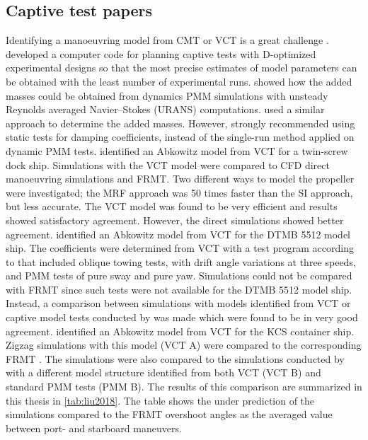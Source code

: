 \subsection{Captive test papers} \label{sec:CT}
Identifying a manoeuvring model from CMT or VCT is a great challenge  \cite{sutuloAlgorithmOfflineIdentification2014}.
\textcite{sutuloSynthesisExperimentalDesigns2004} developed a computer code for planning captive tests with D-optimized experimental designs so that the most precise estimates of model parameters can be obtained with the least number of experimental runs.
\textcite{sakamotoURANSSimulationsStatic2012} showed how the added masses could be obtained from dynamics PMM simulations with unsteady Reynolds averaged Navier–Stokes (URANS) computations. \textcite{elmoctarRANSBasedSimulatedShip2014} used a similar approach to determine the added masses. 
However, \textcite{sakamotoURANSSimulationsStatic2012} strongly recommended using static tests for damping coefficients, instead of the single-run method applied on dynamic PMM tests.
\textcite{elmoctarRANSBasedSimulatedShip2014} identified an Abkowitz model from VCT for a twin-screw dock ship. Simulations with the VCT model were compared to CFD direct manoeuvring simulations and FRMT. Two different ways to model the propeller were investigated; the MRF approach was 50 times faster than the SI approach, but less accurate. The VCT model was found to be very efficient and results showed satisfactory agreement. However, the direct simulations showed better agreement.
\textcite{hajivandVirtualSimulationManeuvering2015} identified an Abkowitz model from VCT for the DTMB 5512 model ship. The coefficients were determined from VCT with a test program according to \textcite{yoonBenchmarkCFDValidation2015c} that included oblique towing tests, with drift angle variations at three speeds, and PMM tests of pure sway and pure yaw.
Simulations could not be compared with FRMT since such tests were not available for the DTMB 5512 model ship. 
Instead, a comparison between simulations with models identified from VCT or captive model tests conducted by \textcite{yoonBenchmarkCFDValidation2015c} was made which were found to be in very good agreement.
\textcite{liuPredictionsShipManeuverability2018} identified an Abkowitz model from VCT for the KCS container ship. Zigzag simulations with this model (VCT A) were compared to the corresponding FRMT \cite{simmanWorkshopVerificationValidation2014}. The simulations were also compared to the simulations conducted by \textcite{simonsenKCSPMMTests2014} with a different model structure identified from both VCT (VCT B) and standard PMM tests (PMM B). The results of this comparison are summarized in this thesis in \autoref{tab:liu2018}. The table shows the under prediction of the simulations compared to the FRMT overshoot angles as the averaged value between port- and starboard maneuvers. 
